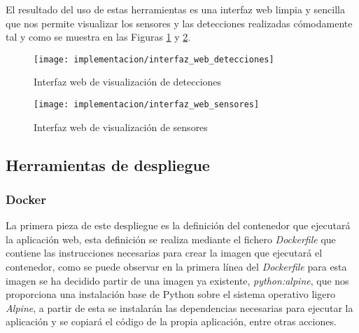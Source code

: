 \documentclass[../proyecto.tex]{subfiles}
\begin{document}
El resultado del uso de estas herramientas es una interfaz web limpia y sencilla que nos permite visualizar los sensores y las detecciones realizadas cómodamente tal y como se muestra en las Figuras \ref{fig:interfaz_web_detecciones} y \ref{fig:interfaz_web_sensores}.\\

\begin{figure}[H]
\centering
\texttt{[image: implementacion/interfaz\_web\_detecciones]}
\caption{Interfaz web de visualización de detecciones}
\label{fig:interfaz_web_detecciones}
\end{figure}

\begin{figure}[H]
\centering
\texttt{[image: implementacion/interfaz\_web\_sensores]}
\caption{Interfaz web de visualización de sensores}
\label{fig:interfaz_web_sensores}
\end{figure}

\subsection{Herramientas de despliegue}

\subsubsection{Docker}

La primera pieza de este despliegue es la definición del contenedor que ejecutará la aplicación web, esta definición se realiza mediante el fichero \textit{Dockerfile} que contiene las instrucciones necesarias para crear la imagen que ejecutará el contenedor, como se puede observar en la primera línea del \textit{Dockerfile} para esta imagen se ha decidido partir de una imagen ya existente, \textit{python:alpine}, que nos proporciona una instalación base de Python sobre el sistema operativo ligero \textit{Alpine}, a partir de esta se instalarán las dependencias necesarias para ejecutar la aplicación y se copiará el código de la propia aplicación, entre otras acciones.\\
\end{document}
